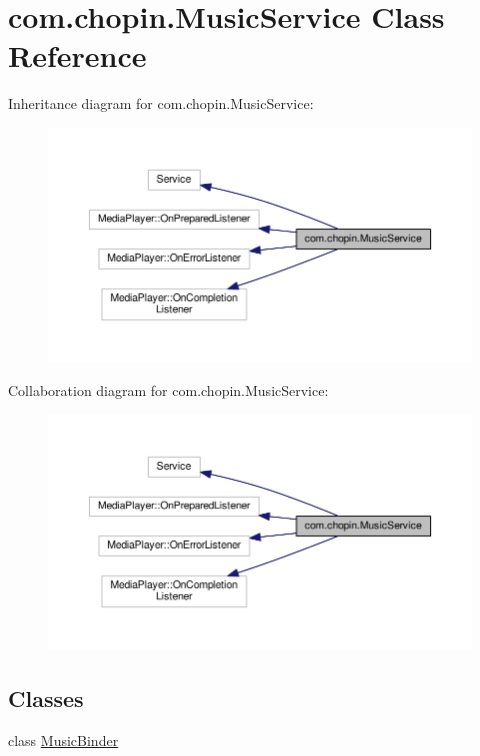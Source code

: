 \hypertarget{classcom_1_1chopin_1_1MusicService}{}\section{com.\+chopin.\+Music\+Service Class Reference}
\label{classcom_1_1chopin_1_1MusicService}


Inheritance diagram for com.\+chopin.\+Music\+Service\+:\nopagebreak
\begin{figure}[H]
\begin{center}
\leavevmode
\includegraphics[width=350pt]{classcom_1_1chopin_1_1MusicService__inherit__graph}
\end{center}
\end{figure}


Collaboration diagram for com.\+chopin.\+Music\+Service\+:\nopagebreak
\begin{figure}[H]
\begin{center}
\leavevmode
\includegraphics[width=350pt]{classcom_1_1chopin_1_1MusicService__coll__graph}
\end{center}
\end{figure}
\subsection*{Classes}
\begin{DoxyCompactItemize}
\item 
class \hyperlink{classcom_1_1chopin_1_1MusicService_1_1MusicBinder}{Music\+Binder}
\end{DoxyCompactItemize}
